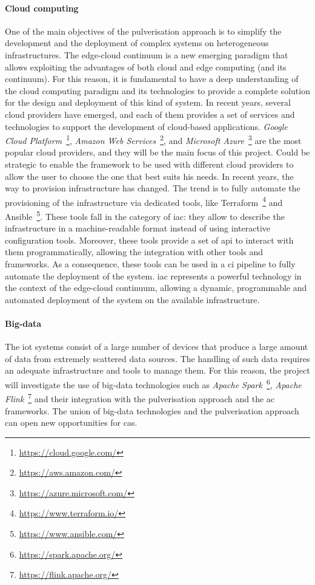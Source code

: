 \documentclass[12pt]{article}
\begin{document}
\paragraph{Cloud computing}
One of the main objectives of the pulverisation approach is to simplify the development
and the deployment of complex systems on heterogeneous infrastructures.
%
The edge-cloud continuum is a new emerging paradigm that allows exploiting the
advantages of both cloud and edge computing (and its continuum).
%
For this reason, it is fundamental to have a deep understanding of the cloud computing
paradigm and its technologies to provide a complete solution for the design and deployment
of this kind of system.
%
In recent years, several cloud providers have emerged, and each of them provides
a set of services and technologies to support the development of cloud-based applications.
%
\emph{Google Cloud Platform}~\footnote{\url{https://cloud.google.com/}},
\emph{Amazon Web Services}~\footnote{\url{https://aws.amazon.com/}},
and \emph{Microsoft Azure}~\footnote{\url{https://azure.microsoft.com/}}
are the most popular cloud providers, and they will be the main focus of this project.
%
Could be strategic to enable the framework to be used with different cloud providers
to allow the user to choose the one that best suits his needs.
%
In recent years,
the way to provision infrastructure has changed.
%
The trend is to fully automate the provisioning of the infrastructure via dedicated tools,
like Terraform~\footnote{\url{https://www.terraform.io/}} and Ansible~\footnote{\url{https://www.ansible.com/}}.
%
These tools fall in the category of \ac{iac}: they allow to describe the infrastructure in a machine-readable format
instead of using interactive configuration tools.
%
Moreover,
these tools provide a set of \ac{api} to interact with them programmatically,
allowing the integration with other tools and frameworks.
%
As a consequence,
these tools can be used in a \ac{ci} pipeline to fully automate the deployment of the system.
%
\ac{iac} represents a powerful technology in the context of the edge-cloud continuum,
allowing a dynamic, programmable and automated deployment of the system on the available infrastructure.

\paragraph{Big-data}
The \ac{iot} systems consist of a large number of devices that produce a large amount of data
from extremely scattered data sources.
%
The handling of such data requires an adequate infrastructure and tools to manage them.
%
For this reason, the project will investigate the use of big-data technologies
such as \emph{Apache Spark}~\footnote{\url{https://spark.apache.org/}},
\emph{Apache Flink}~\footnote{\url{https://flink.apache.org/}} and their integration with the pulverisation approach and the \ac{ac} frameworks.
%
The union of big-data technologies and the pulverisation approach can open new opportunities for \ac{cas}.
\end{document}
